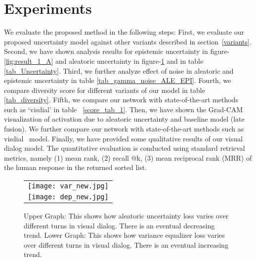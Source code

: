 \documentclass[review]{elsarticle}
\begin{document}
\section{Experiments}{\label{experiments}}
We evaluate the proposed method in the following steps: First, we evaluate our proposed uncertainty model against other variants described in section~\ref{variants}. Second, we have shown analysis results for epistemic uncertainty in figure-\ref{fig:result_1_A} and aleatoric uncertainty in figure-\ref{fig:result_ale} and in table \ref{tab_Uncertainty}. Third, we further analyze effect of noise in aleatoric and epistemic uncertainty in table \ref{tab_gamma_noise_ALE_EPI}. Fourth, we compare diversity score for different variants of our model in table \ref{tab_diversity}. Fifth, we compare our network with state-of-the-art methods such as `visdial' \cite{Das_CVPR2017} in table ~\ref{score_tab_1}. Then, we have shown the Grad-CAM \cite{selvaraju2017grad} visualization of activation due to aleatoric uncertainty and baseline model (late fusion). We further compare our network with state-of-the-art methods such as visdial~\cite{Das_CVPR2017} model. Finally, we have provided some qualitative results of our visual dialog model. 
The quantitative evaluation is conducted using standard retrieval metrics, namely (1) mean rank, (2) recall @k, (3) mean reciprocal rank (MRR) of the human response in the returned sorted list.


\begin{figure}[!htb]
	\small
	\centering
	\begin{tabular}[b]{ c}
\texttt{[image: var\_new.jpg]}\\
\texttt{[image: dep\_new.jpg]}
		\vspace{-0.72em}
	\end{tabular}
	\caption{Upper Graph: This shows how aleatoric uncertainty loss varies over different turns in visual dialog. There is an eventual decreasing trend. Lower Graph: This shows how variance equalizer loss varies over different turns in visual dialog. There is an eventual increasing trend.}
\label{fig:result_ale}
\end{figure}
\end{document}
